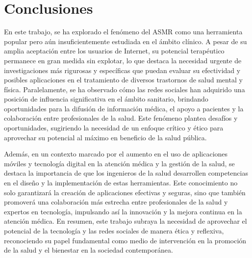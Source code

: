 \documentclass[a4paper,12pt,twoside]{memoir}
\begin{document}
\chapter{Conclusiones}
En este trabajo, se ha explorado el fenómeno del ASMR como una herramienta popular pero aún insuficientemente estudiada en el ámbito clínico. A pesar de su amplia aceptación entre los usuarios de Internet, su potencial terapéutico permanece en gran medida sin explotar, lo que destaca la necesidad urgente de investigaciones más rigurosas y específicas que puedan evaluar su efectividad y posibles aplicaciones en el tratamiento de diversos trastornos de salud mental y física. Paralelamente, se ha observado cómo las redes sociales han adquirido una posición de influencia significativa en el ámbito sanitario, brindando oportunidades para la difusión de información médica, el apoyo a pacientes y la colaboración entre profesionales de la salud. Este fenómeno plantea desafíos y oportunidades, sugiriendo la necesidad de un enfoque crítico y ético para aprovechar su potencial al máximo en beneficio de la salud pública.

Además, en un contexto marcado por el aumento en el uso de aplicaciones móviles y tecnología digital en la atención médica y la gestión de la salud, se destaca la importancia de que los ingenieros de la salud desarrollen competencias en el diseño y la implementación de estas herramientas. Este conocimiento no solo garantizará la creación de aplicaciones efectivas y seguras, sino que también promoverá una colaboración más estrecha entre profesionales de la salud y expertos en tecnología, impulsando así la innovación y la mejora continua en la atención médica. En resumen, este trabajo subraya la necesidad de aprovechar el potencial de la tecnología y las redes sociales de manera ética y reflexiva, reconociendo su papel fundamental como medio de intervención en la promoción de la salud y el bienestar en la sociedad contemporánea.
\end{document}
